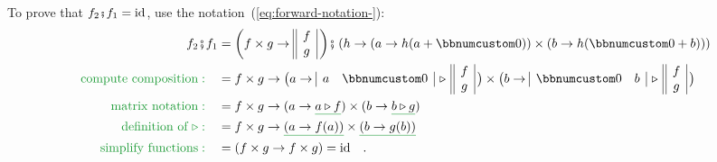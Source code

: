To prove that $f_{2}\bef f_{1}=\text{id}$, use the notation~(\ref{eq:forward-notation-}):
\begin{align*}
f_{2}\bef f_{1} & =\bigg(f\times g\rightarrow\begin{array}{||c|}
f\\
g
\end{array}\,\bigg)\bef\left(h\rightarrow(a\rightarrow h(a+\bbnum 0))\times(b\rightarrow h(\bbnum 0+b))\right)\\
{\color{greenunder}\text{compute composition}:}\quad & =f\times g\rightarrow\big(a\rightarrow\begin{array}{|cc|}
a & \bbnum 0\end{array}\,\triangleright\,\begin{array}{||c|}
f\\
g
\end{array}\,\big)\times\big(b\rightarrow\begin{array}{|cc|}
\bbnum 0 & b\end{array}\,\triangleright\,\begin{array}{||c|}
f\\
g
\end{array}\,\big)\\
{\color{greenunder}\text{matrix notation}:}\quad & =f\times g\rightarrow(a\rightarrow\gunderline{a\triangleright f})\times(b\rightarrow\gunderline{b\triangleright g})\\
{\color{greenunder}\text{definition of }\triangleright:}\quad & =f\times g\rightarrow\gunderline{\left(a\rightarrow f(a)\right)}\times\gunderline{\left(b\rightarrow g(b)\right)}\\
{\color{greenunder}\text{simplify functions}:}\quad & =\left(f\times g\rightarrow f\times g\right)=\text{id}\quad.
\end{align*}


